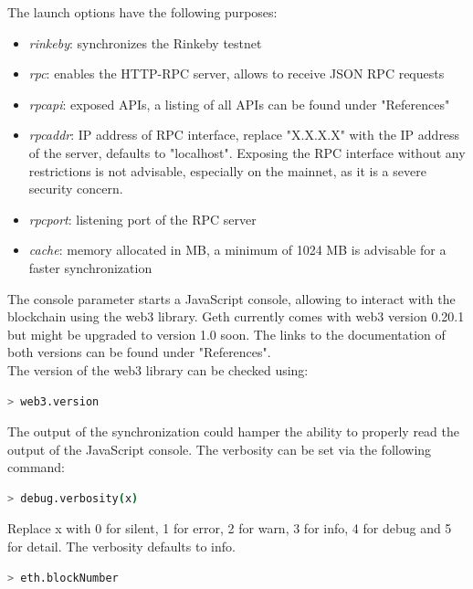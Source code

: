 The launch options have the following purposes\cite{cli-options}:
\begin{itemize}
    \item \textit{rinkeby}: synchronizes the Rinkeby testnet
    \item \textit{rpc}: enables the HTTP-RPC server, allows to receive JSON RPC requests
    \item \textit{rpcapi}: exposed APIs, a listing of all APIs can be found under "References"\cite{json-rpc}\cite{management-apis}
    \item \textit{rpcaddr}: IP address of RPC interface, replace "X.X.X.X" with the IP address of the server, defaults to "localhost".
    Exposing the RPC interface without any restrictions is not advisable, especially on the mainnet, as it is a severe security concern.
    \item \textit{rpcport}: listening port of the RPC server
    \item \textit{cache}: memory allocated in MB, a minimum of 1024 MB is advisable for a faster synchronization
\end{itemize}
The console parameter starts a JavaScript console, allowing to interact with the blockchain using the web3 library.
Geth currently comes with web3 version 0.20.1\cite{javascript-0.20} but might be upgraded to version 1.0\cite{javascript-1.0} soon.
The links to the documentation of both versions can be found under "References".
\\
The version of the web3 library can be checked using:

\begin{lstlisting}[language=bash, numbers=none]
  > web3.version
\end{lstlisting}

The output of the synchronization could hamper the ability to properly read the output of the JavaScript console.
The verbosity can be set via the following command:

\begin{lstlisting}[language=bash, numbers=none]
  > debug.verbosity(x)
\end{lstlisting}

Replace x with 0 for silent, 1 for error, 2 for warn, 3 for info, 4 for debug and 5 for detail.
The verbosity defaults to info\cite{cli-options}.
\newpage

\begin{lstlisting}[language=bash, numbers=none]
  > eth.blockNumber
\end{lstlisting}

